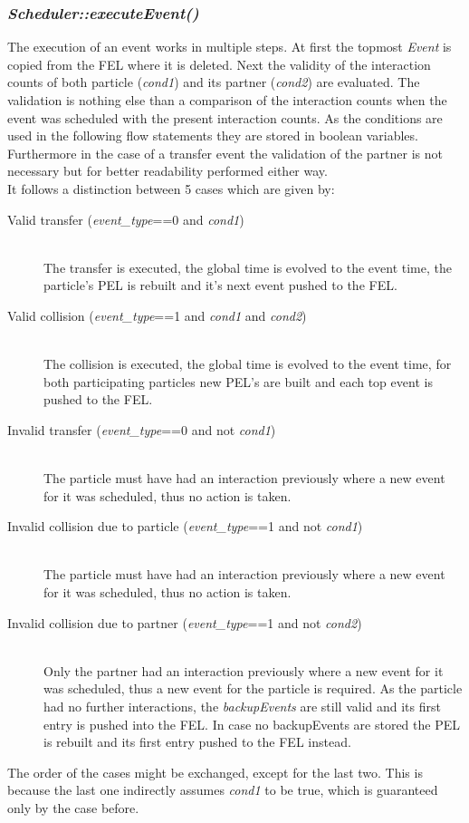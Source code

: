 \subsubsection{\quad \textit{Scheduler::executeEvent()}}
The execution of an event works in multiple steps. At first the topmost \textit{Event} is copied from the FEL where it is deleted. Next the validity of the interaction counts of both particle (\textit{cond1}) and its partner (\textit{cond2}) are evaluated. The validation is nothing else than a comparison of the interaction counts when the event was scheduled with the present interaction counts. As the conditions are used in the following flow statements they are stored in boolean variables. Furthermore in the case of a transfer event the validation of the partner is not necessary but for better readability performed either way.\\
It follows a distinction between 5 cases which are given by:
\begin{description}
\item[Valid transfer (\textit{event\_type}==0 and \textit{cond1}) ] \hfill \\ The transfer is executed, the global time is evolved to the event time, the particle's PEL is rebuilt and it's next event pushed to the FEL.
\item[Valid collision (\textit{event\_type}==1 and \textit{cond1} and \textit{cond2}) ]\hfill \\ The collision is executed, the global time is evolved to the event time, for both participating particles new PEL's are built and each top event is pushed to the FEL.
\item[Invalid transfer (\textit{event\_type}==0 and not \textit{cond1})] \hfill \\ The particle must have had an interaction previously where a new event for it was scheduled, thus no action is taken.
\item[Invalid collision due to particle (\textit{event\_type}==1 and not \textit{cond1})] \hfill \\  The particle must have had an interaction previously where a new event for it was scheduled, thus no action is taken.
\item[Invalid collision due to partner (\textit{event\_type}==1 and not \textit{cond2})] \hfill \\  Only the partner had an interaction previously where a new event for it was scheduled, thus a new event for the particle is required. As the particle had no further interactions, the \textit{backupEvents} are still valid and its first entry is pushed into the FEL. In case no backupEvents are stored the PEL is rebuilt and its first entry pushed to the FEL instead.
\end{description}
The order of the cases might be exchanged, except for the last two. This is because the last one indirectly assumes \textit{cond1} to be true, which is guaranteed only by the case before.\\

